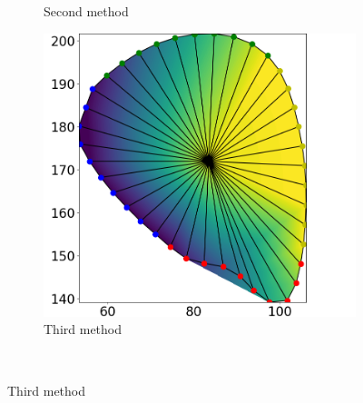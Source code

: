 \begin{figure}
\begin{subfigure}[t]{0.31\textwidth}
    \caption{Second method}%
    \label{fig:triu_1}%
  \end{subfigure}
  \quad
  \begin{subfigure}[t]{0.31\textwidth}%
    \centering%
    \includegraphics[width=\textwidth]{images/fiber_creation/u_2.png}%
    \caption{Third method}%
    \label{fig:triu_2}%
  \end{subfigure}\\
  

\end{figure}
